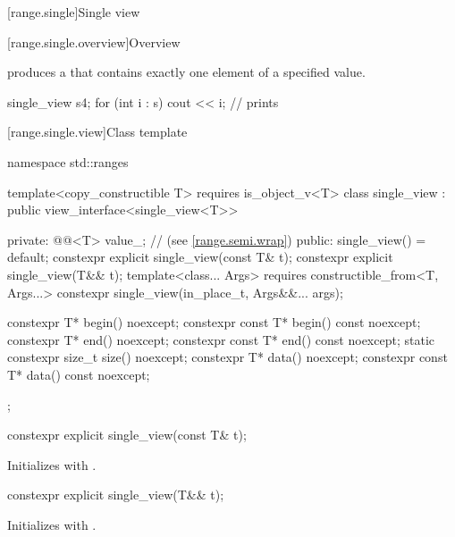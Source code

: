 [range.single]{Single view}

[range.single.overview]{Overview}

\pnum
{} produces a  that contains
exactly one element of a specified value.

\pnum
\begin{example}
\begin{codeblock}
single_view s{4};
for (int i : s)
  cout << i;        // prints 
\end{codeblock}
\end{example}

[range.single.view]{Class template }

%
\begin{codeblock}
namespace std::ranges {
  template<copy_constructible T>
    requires is_object_v<T>
  class single_view : public view_interface<single_view<T>> {
  private:
    @@<T> value_;      // \expos{} (see \ref{range.semi.wrap})
  public:
    single_view() = default;
    constexpr explicit single_view(const T& t);
    constexpr explicit single_view(T&& t);
    template<class... Args>
      requires constructible_from<T, Args...>
    constexpr single_view(in_place_t, Args&&... args);

    constexpr T* begin() noexcept;
    constexpr const T* begin() const noexcept;
    constexpr T* end() noexcept;
    constexpr const T* end() const noexcept;
    static constexpr size_t size() noexcept;
    constexpr T* data() noexcept;
    constexpr const T* data() const noexcept;
  };
}
\end{codeblock}

%
\begin{itemdecl}
constexpr explicit single_view(const T& t);
\end{itemdecl}

\begin{itemdescr}
\pnum
\effects
Initializes  with .
\end{itemdescr}

%
\begin{itemdecl}
constexpr explicit single_view(T&& t);
\end{itemdecl}

\begin{itemdescr}
\pnum
\effects
Initializes  with .
\end{itemdescr}

